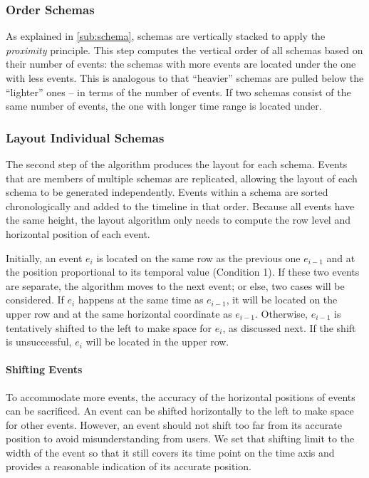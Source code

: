\subsubsection{Order Schemas}
As explained in \autoref{sub:schema}, schemas are vertically stacked to apply the \emph{proximity} principle. This step computes the vertical order of all schemas based on their number of events: the schemas with more events are located under the one with less events. This is analogous to that ``heavier'' schemas are pulled below the ``lighter'' ones -- in terms of the number of events. If two schemas consist of the same number of events, the one with longer time range is located under.

\subsubsection{Layout Individual Schemas}
\label{sub:layout-schema}
The second step of the algorithm produces the layout for each schema. Events that are members of multiple schemas are replicated, allowing the layout of each schema to be generated independently. Events within a schema are sorted chronologically and added to the timeline in that order. Because all events have the same height, the layout algorithm only needs to compute the row level and horizontal position of each event. 

Initially, an event $e_i$ is located on the same row as the previous one $e_{i-1}$ and at the position proportional to its temporal value (Condition 1). If these two events are separate, the algorithm moves to the next event; or else, two cases will be considered. If $e_i$ happens at the same time as $e_{i-1}$, it will be located on the upper row and at the same horizontal coordinate as $e_{i-1}$. Otherwise, $e_{i-1}$ is tentatively shifted to the left to make space for $e_i$, as discussed next. If the shift is unsuccessful, $e_i$ will be located in the upper row.

\paragraph*{Shifting Events}
To accommodate more events, the accuracy of the horizontal positions of events can be sacrificed. An event can be shifted horizontally to the left to make space for other events. However, an event should not shift too far from its accurate position to avoid misunderstanding from users. We set that shifting limit to the width of the event so that it still covers its time point on the time axis and provides a reasonable indication of its accurate position. 

